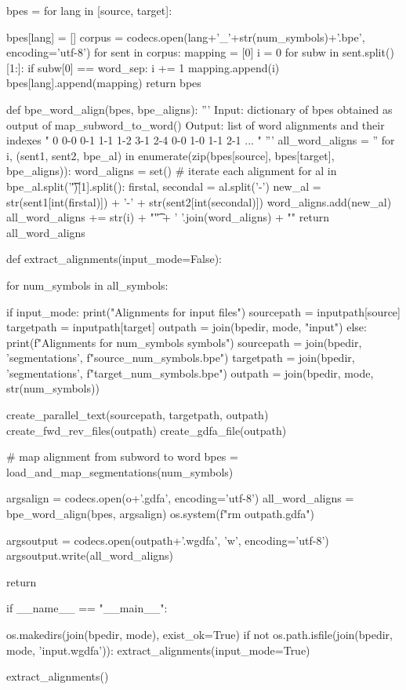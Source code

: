\begin{python}
    bpes = {}
    for lang in [source, target]:

        bpes[lang] = []
        corpus = codecs.open(lang+'_'+str(num_symbols)+'.bpe', encoding='utf-8')
        for sent in corpus:
          mapping = [0]
          i = 0
          for subw in sent.split()[1:]:
              if subw[0] == word_sep:
                i += 1
              mapping.append(i)
          bpes[lang].append(mapping)
    return bpes

def bpe_word_align(bpes, bpe_aligns):
    '''
    Input: dictionary of bpes obtained as output of map_subword_to_word()
    Output: list of word alignments and their indexes
        "
            0   0-0 0-1 1-1 1-2 3-1 2-4    0-0 1-0 1-1 2-1 \n
            ...
        "
    '''
    all_word_aligns = ''
    for i, (sent1, sent2, bpe_al) in enumerate(zip(bpes[source], bpes[target], bpe_aligns)):
        word_aligns = set()
        # iterate each alignment
        for al in bpe_al.split('\t')[1].split():
            firstal, secondal = al.split('-')
            new_al = str(sent1[int(firstal)]) + '-' + str(sent2[int(secondal)])
            word_aligns.add(new_al)
        all_word_aligns += str(i) + "\t" + ' '.join(word_aligns) + "\n"
    return all_word_aligns

def extract_alignments(input_mode=False):

  for num_symbols in all_symbols:

    if input_mode:
      print("Alignments for input files")
      sourcepath = inputpath[source]
      targetpath = inputpath[target]
      outpath = join(bpedir, mode, "input")
    else:
      print(f"Alignments for {num_symbols} symbols")
      sourcepath = join(bpedir, 'segmentations', f"{source}_{num_symbols}.bpe")
      targetpath = join(bpedir, 'segmentations', f"{target}_{num_symbols}.bpe")
      outpath = join(bpedir, mode, str(num_symbols))

    create_parallel_text(sourcepath, targetpath, outpath)
    create_fwd_rev_files(outpath)
    create_gdfa_file(outpath)

    # map alignment from subword to word
    bpes = load_and_map_segmentations(num_symbols)

    argsalign = codecs.open(o+'.gdfa', encoding='utf-8')
    all_word_aligns = bpe_word_align(bpes, argsalign)
    os.system(f"rm {outpath}.gdfa")

    argsoutput = codecs.open(outpath+'.wgdfa', 'w', encoding='utf-8')
    argsoutput.write(all_word_aligns)

  return

if __name__ == "__main__":

  os.makedirs(join(bpedir, mode), exist_ok=True)
  if not os.path.isfile(join(bpedir, mode, 'input.wgdfa')):
    extract_alignments(input_mode=True)

  extract_alignments()
\end{python}

